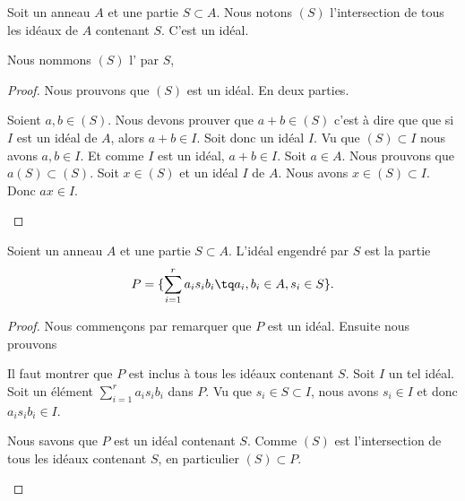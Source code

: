 \begin{propositionDef}  \label{DefSKTooOTauAR}
	Soit un anneau \( A\) et une partie \( S\subset A\). Nous notons \( (S)\) l'intersection de tous les idéaux de \( A\) contenant \( S\). C'est un idéal.

	Nous nommons \( (S)\) l' par \( S\),
\end{propositionDef}

\begin{proof}
	Nous prouvons que \( (S)\) est un idéal. En deux parties.
	\begin{subproof}
		\spitem[Somme]
		Soient \( a,b\in (S)\). Nous devons prouver que \( a+b\in (S)\) c'est à dire que que si \( I\) est un idéal de \( A\), alors \( a+b\in I\). Soit donc un idéal \( I\). Vu que \( (S)\subset I\) nous avons \( a,b\in I\). Et comme \( I\) est un idéal, \( a+b\in I\).
		\spitem[\( a(S)\subset (S)\)]
		Soit \( a\in A\). Nous prouvons que \( a(S)\subset (S)\). Soit \( x\in (S)\) et un idéal \( I\) de \( A\). Nous avons \( x\in (S)\subset I\). Donc \( ax\in I\).
	\end{subproof}
\end{proof}

\begin{proposition}	\label{PROPooDTYUooJPzPZV}
	Soient un anneau \( A\) et une partie \( S\subset A\). L'idéal engendré par \( S\) est la partie
	\begin{equation}
		P=\{ \sum_{i=1}^ra_is_ib_i \tq a_i,b_i\in A, s_i\in S \}.
	\end{equation}
\end{proposition}

\begin{proof}
	Nous commençons par remarquer que \( P\) est un idéal. Ensuite nous prouvons
	\begin{subproof}
		\spitem[\( P\subset (S)\)]
		Il faut montrer que \( P\) est inclus à tous les idéaux contenant \( S\). Soit \( I\) un tel idéal. Soit un élément \( \sum_{i=1}^ra_is_ib_i\) dans \( P\). Vu que \( s_i\in S\subset I\), nous avons \( s_i\in I\) et donc \( a_is_ib_i\in I\).

		\spitem[\( (S)\subset P\)]
		Nous savons que \( P\) est un idéal contenant \( S\). Comme \( (S)\) est l'intersection de tous les idéaux contenant \( S\), en particulier \( (S)\subset P\).
	\end{subproof}
\end{proof}


